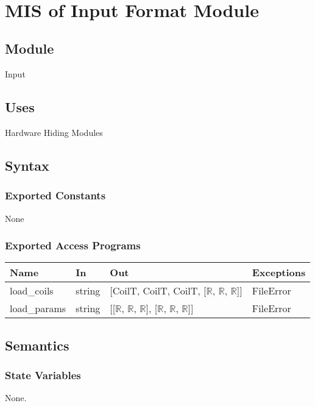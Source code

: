 \documentclass[12pt, titlepage]{article}
\begin{document}
\newpage
~\newpage

\section{MIS of Input Format Module} \label{MIF}

\subsection{Module}
Input

\subsection{Uses}
Hardware Hiding Modules

\subsection{Syntax}

\subsubsection{Exported Constants}
None
\subsubsection{Exported Access Programs}

\begin{center}
\begin{tabular}{p{3cm} p{3cm} p{4cm} p{2cm}}
\hline
\textbf{Name} & \textbf{In} & \textbf{Out} & \textbf{Exceptions} \\
\hline
load\_coils & string & [CoilT, CoilT, CoilT, [$\mathbb{R}$, $\mathbb{R}$, $\mathbb{R}$]] & FileError  \\
\hline
load\_params & string & [[$\mathbb{R}$, $\mathbb{R}$, $\mathbb{R}$], [$\mathbb{R}$, $\mathbb{R}$, $\mathbb{R}$]]  & FileError  \\
\hline
\end{tabular}
\end{center}

\subsection{Semantics}

\subsubsection{State Variables}
None.
\end{document}

